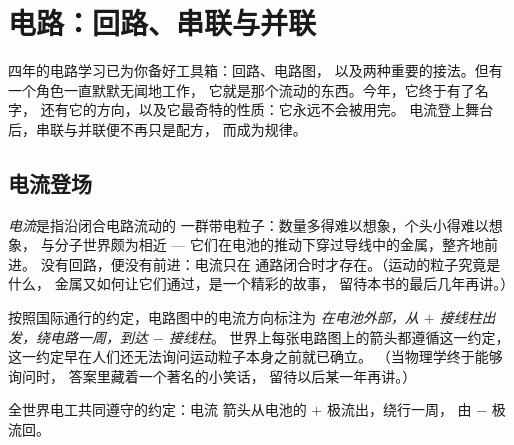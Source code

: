\chapter{电路：回路、串联与并联}\label{ch:g7:circuits-series-parallel}

四年的电路学习已为你备好工具箱：回路、电路图，
以及两种重要的接法。但有一个角色一直默默无闻地工作，
它就是那个流动的东西。今年，它终于有了名字，
还有它的方向，以及它最奇特的性质：它永远不会被用完。
电流登上舞台后，串联与并联便不再只是配方，
而成为规律。

\section{电流登场}

\begin{definition}[电流]\label{def:g7:circuits-series-parallel:current}
\emph{电流}是指沿闭合电路流动的
一群带电粒子：数量多得难以想象，个头小得难以想象，
与分子世界颇为相近 ---
它们在电池的推动下穿过导线中的金属，整齐地前进。
没有回路，便没有前进：电流只在
通路闭合时才存在。（运动的粒子究竟是什么，
金属又如何让它们通过，是一个精彩的故事，
留待本书的最后几年再讲。）
\end{definition}

\begin{proposition}[约定的方向]\label{prop:g7:circuits-series-parallel:direction}
按照国际通行的约定，电路图中的电流方向标注为
\emph{在电池外部，从 $+$ 接线柱出发，绕电路一周，到达 $-$ 接线柱}。
世界上每张电路图上的箭头都遵循这一约定，
这一约定早在人们还无法询问运动粒子本身之前就已确立。
（当物理学终于能够询问时，
答案里藏着一个著名的小笑话，
留待以后某一年再讲。）
\end{proposition}

\begin{omfigure}

{\small 全世界电工共同遵守的约定：电流
箭头从电池的 $+$ 极流出，绕行一周，
由 $-$ 极流回。}
\end{omfigure}

